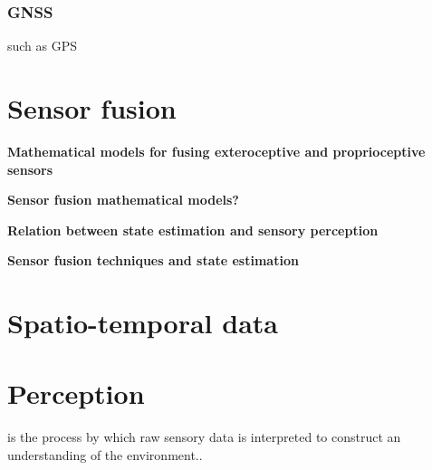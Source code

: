          \subsubsection{GNSS}
            such as GPS
            
\section{Sensor fusion}
    \textbf {Mathematical models for fusing exteroceptive and proprioceptive sensors}
    
    \textbf{Sensor fusion mathematical models?}
    
    \textbf{Relation between state estimation and sensory perception}
    
    \textbf{Sensor fusion techniques and state estimation}

\section{Spatio-temporal data}

\section{Perception}  is the process by which raw sensory data is interpreted to construct an understanding of the environment..

